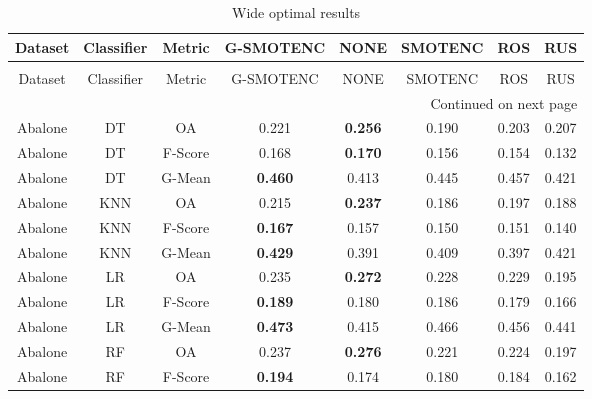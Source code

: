 \begin{longtable}{cccccccc}
\caption{Wide optimal results}
\label{tbl:wide_optimal}\\
\toprule
           Dataset & Classifier &  Metric &      G-SMOTENC &           NONE &        SMOTENC &            ROS &            RUS \\
\midrule
\endfirsthead
\caption[]{Wide optimal results} \\
\toprule
           Dataset & Classifier &  Metric &      G-SMOTENC &           NONE &        SMOTENC &            ROS &            RUS \\
\midrule
\endhead
\midrule
\multicolumn{8}{r}{{Continued on next page}} \\
\midrule
\endfoot

\bottomrule
\endlastfoot
           Abalone &         DT &      OA &          0.221 & \textbf{0.256} &          0.190 &          0.203 &          0.207 \\
           Abalone &         DT & F-Score &          0.168 & \textbf{0.170} &          0.156 &          0.154 &          0.132 \\
           Abalone &         DT &  G-Mean & \textbf{0.460} &          0.413 &          0.445 &          0.457 &          0.421 \\
           Abalone &        KNN &      OA &          0.215 & \textbf{0.237} &          0.186 &          0.197 &          0.188 \\
           Abalone &        KNN & F-Score & \textbf{0.167} &          0.157 &          0.150 &          0.151 &          0.140 \\
           Abalone &        KNN &  G-Mean & \textbf{0.429} &          0.391 &          0.409 &          0.397 &          0.421 \\
           Abalone &         LR &      OA &          0.235 & \textbf{0.272} &          0.228 &          0.229 &          0.195 \\
           Abalone &         LR & F-Score & \textbf{0.189} &          0.180 &          0.186 &          0.179 &          0.166 \\
           Abalone &         LR &  G-Mean & \textbf{0.473} &          0.415 &          0.466 &          0.456 &          0.441 \\
           Abalone &         RF &      OA &          0.237 & \textbf{0.276} &          0.221 &          0.224 &          0.197 \\
           Abalone &         RF & F-Score & \textbf{0.194} &          0.174 &          0.180 &          0.184 &          0.162 \\

\end{longtable}
